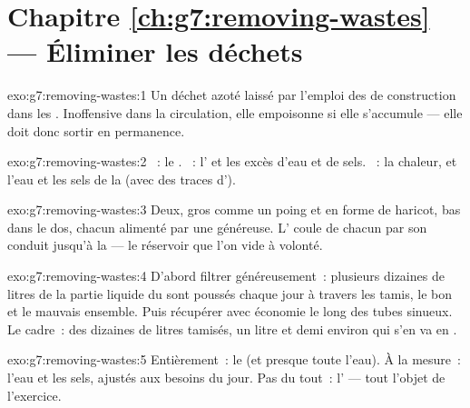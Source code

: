 \section*{Chapitre \ref{ch:g7:removing-wastes} --- Éliminer les déchets}

\begin{solution}{exo:g7:removing-wastes:1}
Un déchet azoté laissé par l'emploi des  de construction
dans les . Inoffensive dans la circulation, elle empoisonne
si elle s'accumule --- elle doit donc sortir en permanence.
\end{solution}

\begin{solution}{exo:g7:removing-wastes:2}
~: le . ~: l' et les excès d'eau
et de sels. ~: la chaleur, et l'eau et les sels de la 
(avec des traces d').
\end{solution}

\begin{solution}{exo:g7:removing-wastes:3}
Deux, gros comme un poing et en forme de haricot, bas dans le dos,
chacun alimenté par une  généreuse. L' coule de chacun
par son conduit jusqu'à la  --- le réservoir que l'on vide à
volonté.
\end{solution}

\begin{solution}{exo:g7:removing-wastes:4}
D'abord filtrer généreusement~: plusieurs dizaines de litres de la
partie liquide du  sont poussés chaque jour à travers les tamis,
le bon et le mauvais ensemble. Puis récupérer avec économie le long
des tubes sinueux. Le cadre~: des dizaines de litres tamisés, un
litre et demi environ qui s'en va en .
\end{solution}

\begin{solution}{exo:g7:removing-wastes:5}
Entièrement~: le  (et presque toute l'eau). À la mesure~:
l'eau et les sels, ajustés aux besoins du jour. Pas du tout~:
l' --- tout l'objet de l'exercice.
\end{solution}

